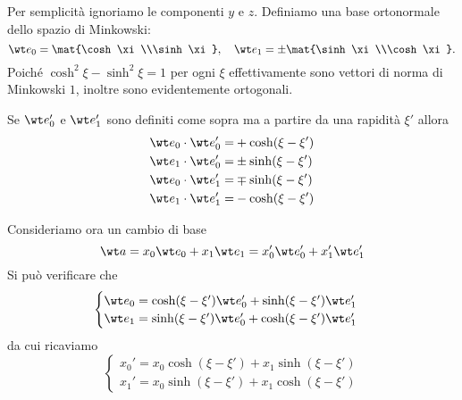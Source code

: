 \noindent Per semplicit\`a ignoriamo le componenti $y$ e $z$. Definiamo una base ortonormale dello spazio di Minkowski:
\[\wt e_0=\mat{\cosh \xi\\\sinh\xi},\quad \wt e_1=\pm \mat{\sinh \xi\\\cosh\xi}.\]
Poich\'e $\cosh^2\xi-\sinh^2\xi=1$ per ogni $\xi$ effettivamente sono vettori di norma di Minkowski $1$, inoltre sono evidentemente ortogonali.
\bigskip

\noindent
Se $\wt e_0'$ e $\wt e_1'$ sono definiti come sopra ma a partire da una rapidit\`a $\xi'$ allora
\begin{align*}
\wt e_0\cdot \wt e_0'=&+\cosh(\xi-\xi')\\
\wt e_1\cdot \wt e_0'=&\pm \sinh(\xi-\xi')\\
\wt e_0\cdot \wt e_1'=&\mp\sinh(\xi-\xi')\\
\wt e_1\cdot \wt e_1'=&-\cosh(\xi-\xi')
\end{align*}

\noindent
Consideriamo ora un cambio di base
\[\wt a=x_0\wt e_0+x_1\wt e_1=x_0'\wt e_0'+x_1'\wt e_1'\]
Si pu\`o verificare che
\[\begin{cases}
\wt e_0=\cosh(\xi-\xi')\wt e_0'+\sinh(\xi-\xi')\wt e_1'\\
\wt e_1=\sinh(\xi-\xi')\wt e_0'+\cosh(\xi-\xi')\wt e_1'
\end{cases}\]
da cui ricaviamo
\[\begin{cases}
x_0'=x_0\cosh(\xi-\xi')+x_1\sinh(\xi-\xi')\\
x_1'=x_0\sinh(\xi-\xi')+x_1\cosh(\xi-\xi')
\end{cases}\]